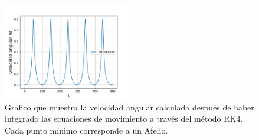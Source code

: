 \documentclass[letterpaper,oneside]{article}
\begin{document}
\begin{figure}
    \centering    
    \includegraphics[width=0.5\textwidth]{Tarea 3/velocidad angular rk4.pdf}
    \caption{Gráfico que muestra la velocidad angular calculada después de haber integrado las ecuaciones de movimiento a través del método RK4. Cada punto mínimo corresponde a un Afelio.}
    \label{graf coordenadas}
\end{figure}{}
\end{document}
